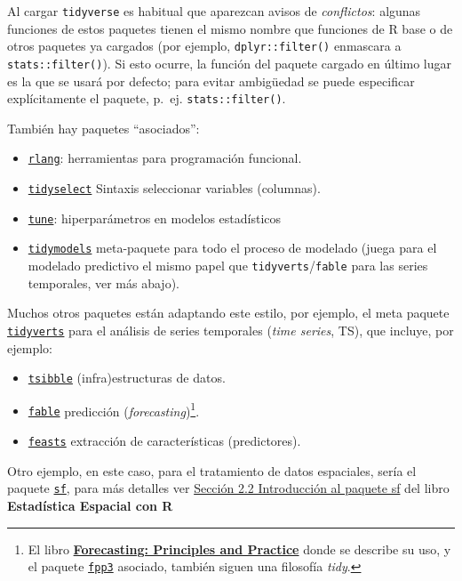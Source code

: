 \documentclass[
]{book}
\providecommand{\tightlist}{%
  \setlength{\itemsep}{0pt}\setlength{\parskip}{0pt}}
\theoremstyle{break}
\theoremstyle{nonumberplain}
\let\oldfootnote\footnote
\renewcommand\footnote[1]{\oldfootnote{\hspace{2mm}#1}}
\begin{document}
Al cargar \texttt{tidyverse} es habitual que aparezcan avisos de \emph{conflictos}: algunas funciones de estos paquetes tienen el mismo nombre que funciones de R base o de otros paquetes ya cargados (por ejemplo, \texttt{dplyr::filter()} enmascara a \texttt{stats::filter()}). Si esto ocurre, la función del paquete cargado en último
lugar es la que se usará por defecto; para evitar ambigüedad se puede
especificar explícitamente el paquete, p.~ej. \texttt{stats::filter()}.

También hay paquetes ``asociados'':

\begin{itemize}
\tightlist
\item
  \href{https://rlang.r-lib.org}{\texttt{rlang}}: herramientas para programación funcional.
\item
  \href{https://tidyselect.r-lib.org}{\texttt{tidyselect}} Sintaxis seleccionar variables (columnas).
\item
  \href{https://tune.tidymodels.org/}{\texttt{tune}}: hiperparámetros en modelos estadísticos
\item
  \href{https://tidymodels.tidymodels.org}{\texttt{tidymodels}} meta-paquete para todo el proceso de modelado (juega para el modelado predictivo el mismo papel que \texttt{tidyverts}/\texttt{fable} para las series temporales, ver más abajo).
\end{itemize}

Muchos otros paquetes están adaptando este estilo, por ejemplo, el meta paquete \href{https://tidyverts.org/}{\texttt{tidyverts}} para el análisis de series temporales (\emph{time series}, TS), que incluye, por ejemplo:

\begin{itemize}
\tightlist
\item
  \href{https://tsibble.tidyverts.org/}{\texttt{tsibble}} (infra)estructuras de datos.
\item
  \href{https://fable.tidyverts.org/}{\texttt{fable}} predicción (\emph{forecasting})\footnote{El libro \href{https://otexts.com/fpp3/}{\textbf{Forecasting: Principles and Practice}} donde se describe su uso, y el paquete \href{https://github.com/robjhyndman/fpp3package}{\texttt{fpp3}} asociado, también siguen una filosofía \emph{tidy}.}.
\item
  \href{https://feasts.tidyverts.org/}{\texttt{feasts}} extracción de características (predictores).
\end{itemize}

Otro ejemplo, en este caso, para el tratamiento de datos espaciales, sería el paquete \href{https://github.com/r-spatial/sf/}{\texttt{sf}}, para más detalles ver \href{https://rubenfcasal.github.io/estadistica_espacial/sf-intro.html}{Sección 2.2 Introducción al paquete sf} del libro \textbf{Estadística Espacial con R}
\end{document}
